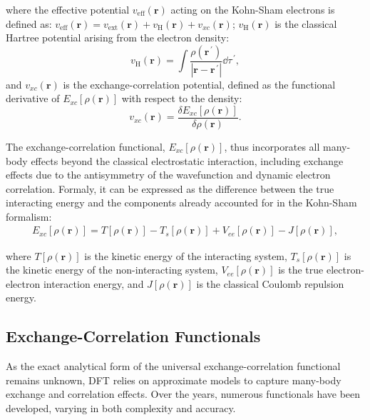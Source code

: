 \noindent where the effective potential $v_{\text{eff}}(\mathbf{r})$ acting on
the Kohn-Sham electrons is defined as: $v_{\text{eff}}(\mathbf{r}) =
v_{\text{ext}}(\mathbf{r}) + v_{\text{H}}(\mathbf{r}) + v_{xc}(\mathbf{r})$;
$v_\text{H}(\mathbf{r})$ is the classical Hartree potential arising from the
electron density:
$$v_\text{H}(\mathbf{r}) = \int
\frac{\rho(\mathbf{r}^{\,\prime})}
{|\mathbf{r}-\mathbf{r}^{\,\prime}|}\dd\tau^{\,\prime},$$
and $v_{xc}(\mathbf{r})$ is the exchange-correlation potential, defined as the
functional derivative of $E_{xc}[\rho(\mathbf{r})]$ with respect to the
density:
$$v_{xc}(\mathbf{r}) = \frac{\delta E_{xc}[\rho(\mathbf{r})]}{\delta\rho(\mathbf{r})}.$$


The exchange-correlation functional, $E_{xc}[\rho(\mathbf{r})]$, thus incorporates all
many-body effects beyond the classical electrostatic interaction, including
exchange effects due to the antisymmetry of the wavefunction and dynamic
electron correlation. Formaly, it can be expressed as the difference between the
true interacting energy and the components already accounted for in the
Kohn-Sham formalism:
%
\begin{align}
  E_{xc}[\rho(\mathbf{r})] = T[\rho(\mathbf{r})] - T_s[\rho(\mathbf{r})] +
    V_{ee}[\rho(\mathbf{r})] - J[\rho(\mathbf{r})] ,
\end{align}

\noindent
where $T[\rho(\mathbf{r})]$ is the kinetic energy of the interacting system,
$T_s[\rho(\mathbf{r})]$ is the kinetic energy of the non-interacting system,
$V_{ee}[\rho(\mathbf{r})]$ is the true electron-electron interaction energy,
and $J[\rho(\mathbf{r})]$ is the classical Coulomb repulsion energy.

\newpage
\subsection{Exchange-Correlation Functionals}

As the exact analytical form of the universal exchange-correlation functional remains
unknown, \gls{DFT} relies on approximate models to capture many-body exchange
and correlation effects. Over the years, numerous functionals have been
developed, varying in both complexity and accuracy.

